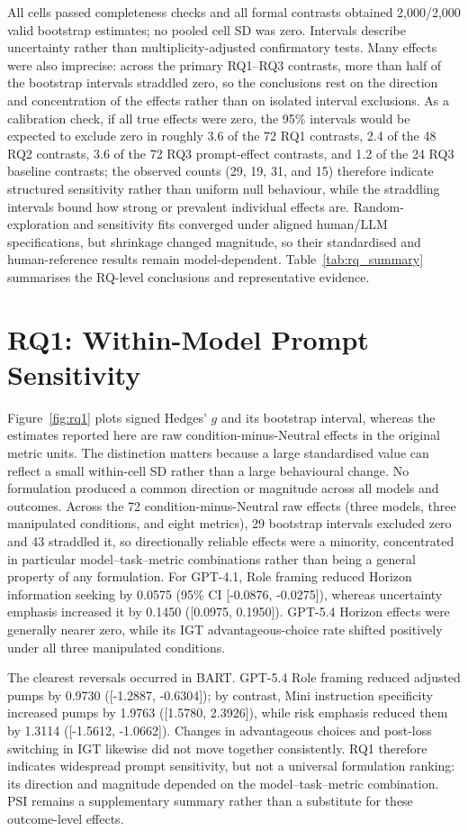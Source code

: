 \documentclass[logo,msc,inf]{infthesis}       %
\begin{document}
All cells passed completeness checks and all formal contrasts obtained 2,000/2,000 valid bootstrap estimates; no pooled cell SD was zero. Intervals describe uncertainty rather than multiplicity-adjusted confirmatory tests. Many effects were also imprecise: across the primary RQ1--RQ3 contrasts, more than half of the bootstrap intervals straddled zero, so the conclusions rest on the direction and concentration of the effects rather than on isolated interval exclusions. As a calibration check, if all true effects were zero, the 95\% intervals would be expected to exclude zero in roughly 3.6 of the 72 RQ1 contrasts, 2.4 of the 48 RQ2 contrasts, 3.6 of the 72 RQ3 prompt-effect contrasts, and 1.2 of the 24 RQ3 baseline contrasts; the observed counts (29, 19, 31, and 15) therefore indicate structured sensitivity rather than uniform null behaviour, while the straddling intervals bound how strong or prevalent individual effects are. Random-exploration and sensitivity fits converged under aligned human/LLM specifications, but shrinkage changed magnitude, so their standardised and human-reference results remain model-dependent. Table~\ref{tab:rq_summary} summarises the RQ-level conclusions and representative evidence.

\section{RQ1: Within-Model Prompt Sensitivity}
Figure~\ref{fig:rq1} plots signed Hedges' $g$ and its bootstrap interval, whereas the estimates reported here are raw condition-minus-Neutral effects in the original metric units. The distinction matters because a large standardised value can reflect a small within-cell SD rather than a large behavioural change. No formulation produced a common direction or magnitude across all models and outcomes. Across the 72 condition-minus-Neutral raw effects (three models, three manipulated conditions, and eight metrics), 29 bootstrap intervals excluded zero and 43 straddled it, so directionally reliable effects were a minority, concentrated in particular model--task--metric combinations rather than being a general property of any formulation. For GPT-4.1, Role framing reduced Horizon information seeking by 0.0575 (95\% CI [-0.0876, -0.0275]), whereas uncertainty emphasis increased it by 0.1450 ([0.0975, 0.1950]). GPT-5.4 Horizon effects were generally nearer zero, while its IGT advantageous-choice rate shifted positively under all three manipulated conditions.

The clearest reversals occurred in BART. GPT-5.4 Role framing reduced adjusted pumps by 0.9730 ([-1.2887, -0.6304]); by contrast, Mini instruction specificity increased pumps by 1.9763 ([1.5780, 2.3926]), while risk emphasis reduced them by 1.3114 ([-1.5612, -1.0662]). Changes in advantageous choices and post-loss switching in IGT likewise did not move together consistently. RQ1 therefore indicates widespread prompt sensitivity, but not a universal formulation ranking: its direction and magnitude depended on the model--task--metric combination. PSI remains a supplementary summary rather than a substitute for these outcome-level effects.
\end{document}
